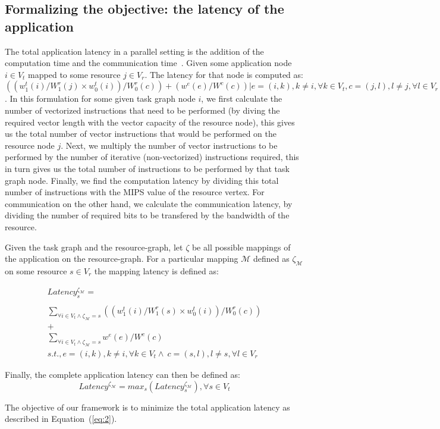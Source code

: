 \subsection{Formalizing the objective: the latency of the application}
\label{sec:form-latency-appl}

The total application latency in a parallel setting is the addition of
the computation time and the communication
time~\cite{ssan05,ajai04}. Given some application node $i \in V_t$
mapped to some resource $j \in V_r$. The latency for that node is
computed as: $((w^t_1(i)/W^r_1(j)\times w^t_0(i))/W^r_0(c))+
(w^e(e)/W^c(c)) | e = (i,k), k \neq i, \forall k \in V_t, c = (j,l), l
\neq j, \forall l \in V_r $. In this formulation for some given
task graph node $i$, we first calculate the number of vectorized
instructions that need to be performed (by diving the required vector
length with the vector capacity of the resource node), this gives us the
total number of vector instructions that would be performed on the
resource node $j$. Next, we multiply the number of vector instructions
to be performed by the number of iterative (non-vectorized) instructions
required, this in turn gives us the total number of instructions to be
performed by that task graph node. Finally, we find the computation
latency by dividing this total number of instructions with the MIPS
value of the resource vertex. For communication on the other hand, we
calculate the communication latency, by dividing the number of required
bits to be transfered by the bandwidth of the resource.

Given the task graph and the resource-graph, let $\zeta$ be all possible
mappings of the application on the resource-graph. For a particular
mapping $\mathcal{M}$ defined as $\zeta_\mathcal{M}$ on some resource $s
\in V_r$ the mapping latency is defined as:

\begin{equation}
  \begin{array}{c}
    Latency^{\zeta_\mathcal{M}}_s = \\
    \\
    \sum_{\forall i \in V_t \wedge
      \zeta_\mathcal{M} = s} ((w^t_1(i)/W^r_1(s)\times w^t_0(i))/W^r_0(c))
    \\
    +
    \\
    \sum_{\forall i \in V_t \wedge
      \zeta_\mathcal{M} = s} w^e(e) / W^c(c)\\ 
    s.t., e = (i,k), k \neq i, \forall k
    \in V_t \wedge\  c = (s,l), l \neq s, \forall l \in V_r
  \end{array}
  \label{eq:1}
\end{equation}

Finally, the complete application latency can then be defined as: 
\begin{equation}
  \tag{OBJECTIVE\_FUNCTION}
  \label{eq:2}
  Latency^{\zeta_\mathcal{M}} = max_{s}
  ({Latency^{\zeta_\mathcal{M}}_s}), \forall s \in V_t
\end{equation}

The objective of our framework is to minimize the total application
latency as described in Equation~(\ref{eq:2}).

